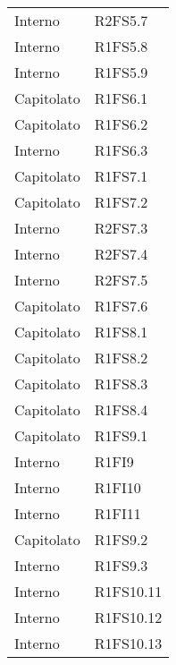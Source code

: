 {\begin{longtable}{ C{4cm} C{4cm}}
Interno & R2FS5.7\\

Interno & R1FS5.8\\

Interno & R1FS5.9\\

Capitolato & R1FS6.1\\

Capitolato & R1FS6.2\\

Interno & R1FS6.3\\

Capitolato & R1FS7.1\\

Capitolato & R1FS7.2\\

Interno & R2FS7.3\\

Interno & R2FS7.4\\

Interno & R2FS7.5\\

Capitolato & R1FS7.6\\

Capitolato & R1FS8.1\\


Capitolato & R1FS8.2\\

Capitolato & R1FS8.3\\

Capitolato & R1FS8.4\\

Capitolato & R1FS9.1\\

Interno & R1FI9\\

Interno & R1FI10\\

Interno & R1FI11\\

Capitolato & R1FS9.2\\


Interno & R1FS9.3\\

Interno & R1FS10.11\\

Interno & R1FS10.12\\

Interno & R1FS10.13\\


\end{longtable}}
